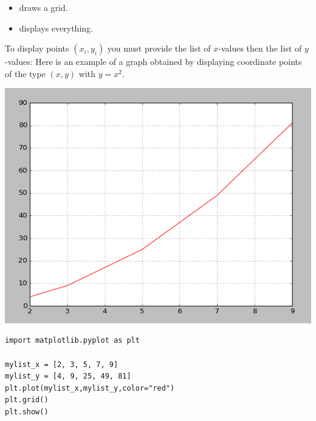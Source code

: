 \documentclass[11pt,class=report,crop=false]{standalone}
\begin{document}
\begin{cours}
\begin{itemize}
  \item {} draws a grid.
  
  \item {} displays everything.  
  
\end{itemize}

\bigskip

To display points $(x_i,y_i)$ you must provide the list of $x$-values then the list of $y$-values:
Here is an example of a graph obtained by displaying coordinate points of the type $(x,y)$ with $y = x^2$.

\begin{center}
\includegraphics[scale=\myscale,scale=0.45]{screen-lists-lesson-visualization-bis}
\end{center}


\begin{lstlisting}
import matplotlib.pyplot as plt

mylist_x = [2, 3, 5, 7, 9]
mylist_y = [4, 9, 25, 49, 81]
plt.plot(mylist_x,mylist_y,color="red")
plt.grid()
plt.show()
\end{lstlisting}

\end{cours}


\end{document}
